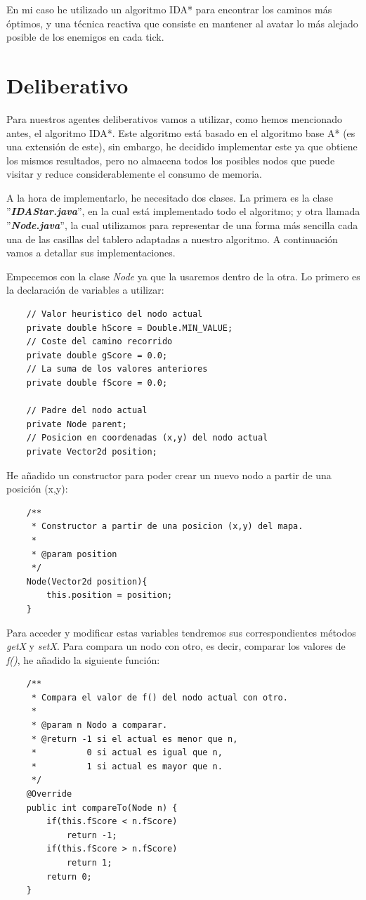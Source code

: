 \documentclass[11pt,a4paper]{article}
\begin{document}
En mi caso he utilizado un algoritmo IDA* para encontrar los caminos más óptimos, y una técnica reactiva
que consiste en mantener al avatar lo más alejado posible de los enemigos en cada tick.


\section{Deliberativo}

Para nuestros agentes deliberativos vamos a utilizar, como hemos mencionado antes, el algoritmo IDA*.
Este algoritmo está basado en el algoritmo base A* (es una extensión de este), sin embargo, he decidido
implementar este ya que obtiene los mismos resultados, pero no almacena todos los posibles nodos que puede
visitar y reduce considerablemente el consumo de memoria.

A la hora de implementarlo, he necesitado dos clases. La primera es la clase ''\textbf{\textit{IDAStar.java}}'',
en la cual está implementado todo el algoritmo; y otra llamada ''\textbf{\textit{Node.java}}'', la cual
utilizamos para representar de una forma más sencilla cada una de las casillas del tablero adaptadas a nuestro
algoritmo. A continuación vamos a detallar sus implementaciones.

Empecemos con la clase \textit{Node} ya que la usaremos dentro de la otra. Lo primero es la declaración de
variables a utilizar:
\newline
\begin{lstlisting}
    // Valor heuristico del nodo actual
    private double hScore = Double.MIN_VALUE;
    // Coste del camino recorrido
    private double gScore = 0.0;
    // La suma de los valores anteriores
    private double fScore = 0.0;

    // Padre del nodo actual
    private Node parent;
    // Posicion en coordenadas (x,y) del nodo actual
    private Vector2d position;
\end{lstlisting}

He añadido un constructor para poder crear un nuevo nodo a partir de una posición (x,y):
\newline
\begin{lstlisting}
    /**
	 * Constructor a partir de una posicion (x,y) del mapa.
	 * 
	 * @param position
	 */
	Node(Vector2d position){
		this.position = position;
	}
\end{lstlisting}

Para acceder y modificar estas variables tendremos sus correspondientes métodos \textit{getX} y \textit{setX}.
Para compara un nodo con otro, es decir, comparar los valores de \textit{f()}, he añadido la siguiente función:
\newline
\begin{lstlisting}
    /**
     * Compara el valor de f() del nodo actual con otro.
     * 
     * @param n Nodo a comparar.
     * @return -1 si el actual es menor que n,
     *          0 si actual es igual que n,
     *          1 si actual es mayor que n.
     */
    @Override
    public int compareTo(Node n) {
        if(this.fScore < n.fScore)
            return -1;
        if(this.fScore > n.fScore)
            return 1;
        return 0;
    }
\end{lstlisting}
\end{document}
